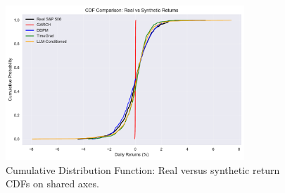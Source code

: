 \begin{figure}[htbp]
\centering
\includegraphics[width=0.8\textwidth]{figures/cdf_comparison.pdf}
\caption{Cumulative Distribution Function: Real versus synthetic return CDFs on shared axes.}
\label{fig:cdf_comparison}
\end{figure}